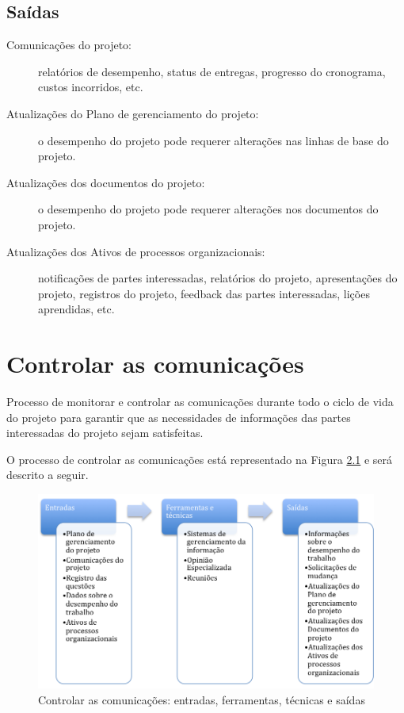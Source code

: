 \section{Saídas}

\begin{description}
	
	\item[Comunicações do projeto:] relatórios de desempenho, status de entregas, progresso do cronograma, custos incorridos, etc.
	
	\item[Atualizações do Plano de gerenciamento do projeto:] o desempenho do projeto pode requerer alterações nas linhas de base do projeto.
	
	\item[Atualizações dos documentos do projeto:] o desempenho do projeto pode requerer alterações nos documentos do projeto.
	
	\item[Atualizações dos Ativos de processos organizacionais:] notificações de partes interessadas, relatórios do projeto, apresentações do projeto, registros do projeto, feedback das partes interessadas, lições aprendidas, etc.


\end{description}

\chapter{Controlar as comunicações}

Processo de monitorar e controlar as comunicações durante todo o ciclo de vida do projeto para garantir que as necessidades de informações das partes interessadas do projeto sejam satisfeitas.

O processo de controlar as comunicações está representado na Figura \ref{fig:comunic:controlar:efts} e será descrito a seguir.

\begin{figure}[!h]
	\centering
	\includegraphics[scale=0.5]{Figuras/comunicacoes_efts_controlar.png}
	\caption{Controlar as comunicações: entradas, ferramentas, técnicas e saídas}
	\label{fig:comunic:controlar:efts}
\end{figure}

